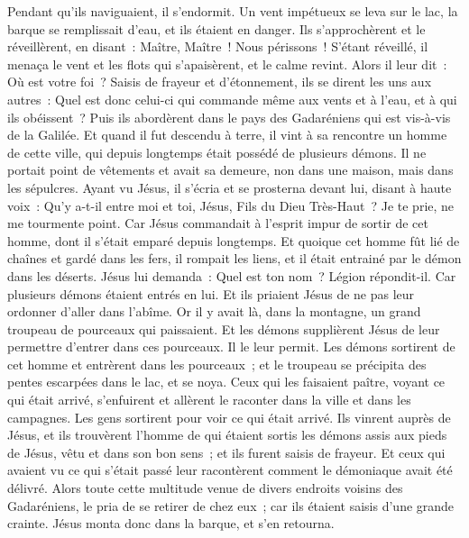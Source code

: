 \begin{multicols}{2}
Pendant qu'ils naviguaient, il s'endormit. Un vent impétueux se leva sur le lac, la barque se remplissait d'eau, et ils étaient en danger.
Ils s'approchèrent et le réveillèrent, en disant~: Maître, Maître~! Nous périssons~! S'étant réveillé, il menaça le vent et les flots qui s'apaisèrent, et le calme revint.
Alors il leur dit~: Où est votre foi~? Saisis de frayeur et d'étonnement, ils se dirent les uns aux autres~: Quel est donc celui-ci qui commande même aux vents et à l'eau, et à qui ils obéissent~?
Puis ils abordèrent dans le pays des Gadaréniens qui est vis-à-vis de la Galilée.
Et quand il fut descendu à terre, il vint à sa rencontre un homme de cette ville, qui depuis longtemps était possédé de plusieurs démons. Il ne portait point de vêtements et avait sa demeure, non dans une maison, mais dans les sépulcres.
Ayant vu Jésus, il s'écria et se prosterna devant lui, disant à haute voix~: Qu'y a-t-il entre moi et toi, Jésus, Fils du Dieu Très-Haut~? Je te prie, ne me tourmente point.
Car Jésus commandait à l'esprit impur de sortir de cet homme, dont il s'était emparé depuis longtemps. Et quoique cet homme fût lié de chaînes et gardé dans les fers, il rompait les liens, et il était entrainé par le démon dans les déserts.
Jésus lui demanda~: Quel est ton nom~? Légion répondit-il. Car plusieurs démons étaient entrés en lui.
Et ils priaient Jésus de ne pas leur ordonner d'aller dans l'abîme.
Or il y avait là, dans la montagne, un grand troupeau de pourceaux qui paissaient. Et les démons supplièrent Jésus de leur permettre d'entrer dans ces pourceaux. Il le leur permit.
Les démons sortirent de cet homme et entrèrent dans les pourceaux~; et le troupeau se précipita des pentes escarpées dans le lac, et se noya.
Ceux qui les faisaient paître, voyant ce qui était arrivé, s'enfuirent et allèrent le raconter dans la ville et dans les campagnes.
Les gens sortirent pour voir ce qui était arrivé. Ils vinrent auprès de Jésus, et ils trouvèrent l'homme de qui étaient sortis les démons assis aux pieds de Jésus, vêtu et dans son bon sens~; et ils furent saisis de frayeur.
Et ceux qui avaient vu ce qui s'était passé leur racontèrent comment le démoniaque avait été délivré.
Alors toute cette multitude venue de divers endroits voisins des Gadaréniens, le pria de se retirer de chez eux~; car ils étaient saisis d'une grande crainte. Jésus monta donc dans la barque, et s'en retourna.

\end{multicols}
